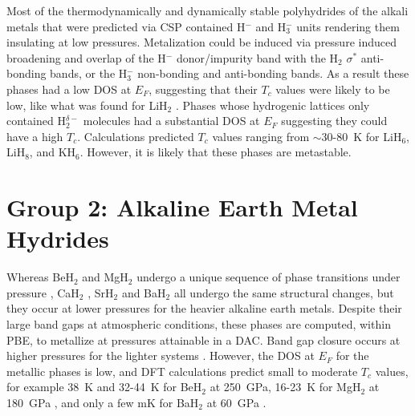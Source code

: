 \documentclass[12pt,letterpaper,oneside]{article}
\begin{document}
Most of the thermodynamically and dynamically stable polyhydrides of the alkali metals that were predicted via CSP contained H$^-$ and H$_3^-$ units rendering them insulating at low pressures. Metalization could be induced via pressure induced broadening and overlap of the H$^-$ donor/impurity band with the H$_2$ $\sigma^*$ anti-bonding bands, or the H$_3^-$ non-bonding and anti-bonding bands. As a result these phases had a low DOS at $E_F$, suggesting that their $T_c$ values were likely to be low, like what was found for LiH$_2$ \cite{Xie:2014a}. Phases whose hydrogenic lattices only contained H$_2^{\delta-}$ molecules had a substantial DOS at $E_F$ suggesting they could have a high $T_c$. Calculations predicted $T_c$ values ranging from $\sim$30-80~K for LiH$_6$, LiH$_8$, and KH$_6$. However, it is likely that these phases are metastable.  %



\section{Group 2: Alkaline Earth Metal Hydrides}
%

Whereas BeH$_2$ and MgH$_2$ undergo a unique sequence of phase transitions under pressure \cite{Wang:2014,Zhang:2007,Vajeeston:2004a,Vajeeston:2006a, Vajeeston:2002a}, CaH$_2$ \cite{Tse:2007b,Li:2007}, SrH$_2$ \cite{Smith:2009a} and BaH$_2$ \cite{Tse:2009a, Chen:2010b} all undergo the same structural changes, but they occur at lower pressures for the heavier alkaline earth metals. Despite their large band gaps at atmospheric conditions, these phases are computed, within PBE, to metallize at pressures attainable in a DAC. Band gap closure occurs at higher pressures for the lighter systems  \cite{Zhang:2010b}.  However, the DOS at $E_F$ for the metallic phases is low, and DFT calculations predict small to moderate $T_c$ values, for example 38~K \cite{Wang:2014} and 32-44~K \cite{Yu:2014} for BeH$_2$ at 250~GPa, 16-23~K for MgH$_2$ at 180~GPa \cite{Lonie:2012}, and only a few mK for BaH$_2$ at 60~GPa  \cite{Tse:2009a}.
\end{document}
